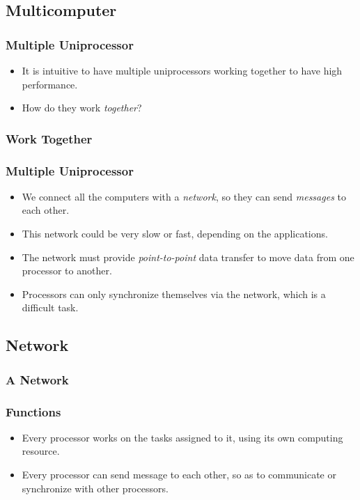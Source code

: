 \documentclass{beamer}
\begin{document}
\begin{CJK}{UTF8}{bsmi}
\section{Multicomputer}

\begin{frame}
\frametitle{Multiple Uniprocessor}
\begin{itemize}
\item It is intuitive to have multiple uniprocessors working together
  to have high performance.
\item How do they work {\em together}?
\end{itemize}
\end{frame}


\begin{frame}
\frametitle{Work Together}
\centerline{}
\end{frame}


\begin{frame}
\frametitle{Multiple Uniprocessor}
\begin{itemize}
\item We connect all the computers with a {\em network}, so they can
  send {\em messages} to each other.
\item This network could be very slow or fast, depending on the
  applications.
\item The network must provide {\em point-to-point} data transfer to
  move data from one processor to another.
\item Processors can only synchronize themselves via the network, which
  is a difficult task.
\end{itemize}
\end{frame}

\subsection{Network}

\begin{frame}
\frametitle{A Network}
\centerline{}
\end{frame}

\begin{frame}
\frametitle{Functions} 
\begin{itemize}
\item Every processor works on the tasks assigned to it, using its own
  computing resource.
\item Every processor can send message to each other, so as to
  communicate or synchronize with other processors.
\end{itemize}
\end{frame}


\end{CJK}
\end{document}
